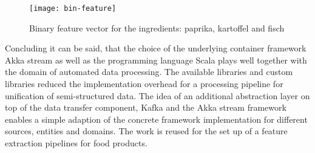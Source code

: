 \begin{figure}[htb]
  \centering
  \texttt{[image: bin-feature]}\\
  \caption{Binary feature vector for the ingredients: paprika, kartoffel and fisch}
  \label{fig:bin-feature}
\end{figure}

Concluding it can be said, that the choice of the underlying container framework Akka stream as well as the programming language Scala plays well together with the domain of automated data processing. The available libraries and custom libraries reduced the implementation overhead for a processing pipeline for unification of semi-structured data. The idea of an additional abstraction layer on top of the data transfer component, Kafka and the Akka stream framework enables a simple adaption of the concrete framework implementation for different sources, entities and domains. The work is reused for the set up of a feature extraction pipelines for food products.